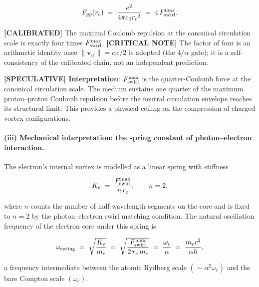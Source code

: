 \documentclass[11pt]{article}
\theoremstyle{definition}
\theoremstyle{plain}
\theoremstyle{remark}
\newcommand{\rc}{{r_c}}
\newcommand{\vnorm}{\lVert \mathbf{v}_{\!\boldsymbol{\circlearrowleft}} \rVert}
\begin{document}
        \begin{align}
            F_{pp}(\rc)
            \;=\; \frac{e^2}{4\pi\varepsilon_0 \rc^2}
            \;=\; 4\,F_{\rm swirl}^{\max}.
            \label{eq:Coulomb_core}
        \end{align}

        \textbf{[CALIBRATED]} The maximal Coulomb repulsion at the canonical circulation scale is exactly four times $F_{\rm swirl}^{\max}$. \textbf{[CRITICAL NOTE]} The factor of four is an arithmetic identity once $\vnorm=\alpha c/2$ is adopted (the $4/\alpha$ gate); it is a self-consistency of the calibrated chain, not an independent prediction.

        \textbf{[SPECULATIVE] Interpretation}: $F_{\rm swirl}^{\max}$ is the quarter-Coulomb force at the canonical circulation scale. The medium sustains one quarter of the maximum proton--proton Coulomb repulsion before the neutral circulation envelope reaches its structural limit. This provides a physical ceiling on the compression of charged vortex configurations.

        \paragraph{(iii) Mechanical interpretation: the spring constant of photon--electron interaction.}

        The electron's internal vortex is modelled as a linear spring with stiffness

        \begin{align}
            K_e \;=\; \frac{F_{\rm swirl}^{\max}}{n\,\rc},
            \qquad n = 2,
            \label{eq:spring_K}
        \end{align}

        where $n$ counts the number of half-wavelength segments on the core and is fixed to $n=2$ by the photon--electron swirl matching condition. The natural oscillation frequency of the electron core under this spring is

        \begin{align}
            \omega_{\rm spring}
            \;=\; \sqrt{\frac{K_e}{m_e}}
            \;=\; \sqrt{\frac{F_{\rm swirl}^{\max}}{2\,\rc\,m_e}}
            \;=\; \frac{\omega_c}{\alpha}
            \;=\; \frac{m_e c^2}{\alpha\hbar},
            \label{eq:omega_spring}
        \end{align}

        a frequency intermediate between the atomic Rydberg scale $(\sim\alpha^2\omega_c)$ and the bare Compton scale $(\omega_c)$.
\end{document}
